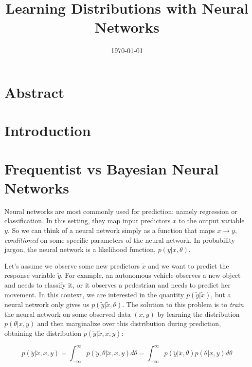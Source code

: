 \documentclass[12pt]{article}
\title{Learning Distributions with Neural Networks}
\author{}
\date{\today}
\begin{document}
\maketitle

\section{Abstract}



\section{Introduction}

\section{Frequentist vs Bayesian Neural Networks}
\label{sec_nn_vs_bnn}

Neural networks are most commonly used for prediction: namely regression or classification. In this setting, they map input predictors $x$ to the output variable $y$. So we can think of a neural network simply as a function that maps $x \rightarrow y$, \textit{conditioned} on some specific parameters of the neural network. In probability jargon, the neural network is a likelihood function, $p(y | x, \theta)$.

Let's assume we observe some new predictors $\tilde{x}$ and we want to predict the response variable $\tilde{y}$. For example, an autonomous vehicle observes a new object and needs to classify it, or it observes a pedestrian and needs to predict her movement. In this context, we are interested in the quantity $p(\tilde{y} | \tilde{x})$, but a neural network only gives us $p(\tilde{y} | \tilde{x}, \theta)$. The solution to this problem is to \textit{train} the neural network on some observed data $(x, y)$ by learning the distribution $p(\theta | x, y)$ and then marginalize over this distribution during prediction, obtaining the distribution $p(\tilde{y} | \tilde{x}, x, y)$:

\begin{equation}
p(\tilde{y} | \tilde{x}, x, y) = \int_{-\infty}^\infty p(\tilde{y}, \theta | \tilde{x}, x, y) d\theta =   \int_{-\infty}^\infty p(\tilde{y} | \tilde{x}, \theta) p(\theta | x, y) d\theta
\label{eq_post_pred}
\end{equation}
\end{document}
